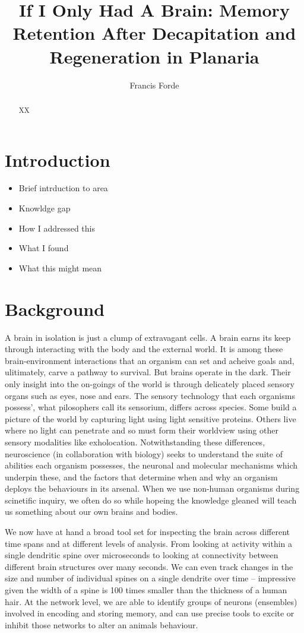 \documentclass[
  letterpaper,
  DIV=11,
  numbers=noendperiod,
  oneside]{scrartcl}
\title{If I Only Had A Brain: Memory Retention After Decapitation and
Regeneration in Planaria}
\author{Francis Forde}
\date{}
\begin{document}
\maketitle
\begin{abstract}
XX
\end{abstract}


\section{Introduction}\label{introduction}

\begin{itemize}
\item
  Brief intrduction to area
\item
  Knowldge gap
\item
  How I addressed this
\item
  What I found
\item
  What this might mean
\end{itemize}

\section{Background}\label{background}

A brain in isolation is just a clump of extravagant cells. A brain earns
its keep through interacting with the body and the external world. It is
among these brain-environment interactions that an organism can set and
acheive goals and, ulitimately, carve a pathway to survival. But brains
operate in the dark. Their only insight into the on-goings of the world
is through delicately placed sensory organs such as eyes, nose and ears.
The sensory technology that each organisms possess', what pilosophers
call its sensorium, differs across species. Some build a picture of the
world by capturing light using light sensitive proteins. Others live
where no light can penetrate and so must form their worldview using
other sensory modalities like exholocation. Notwithstanding these
differences, neuroscience (in collaboration with biology) seeks to
understand the suite of abilities each organism possesses, the neuronal
and molecular mechanisms which underpin these, and the factors that
determine when and why an organism deploys the behaviours in its
arsenal. When we use non-human organisms during scinetific inquiry, we
often do so while hopeing the knowledge gleaned will teach us something
about our own brains and bodies.

We now have at hand a broad tool set for inspecting the brain across
different time spans and at different levels of analysis. From looking
at activity within a single dendritic spine over microseconds to looking
at connectivity between different brain structures over many seconds. We
can even track changes in the size and number of individual spines on a
single dendrite over time -- impressive given the width of a spine is
100 times smaller than the thickness of a human hair. At the network
level, we are able to identify groups of neurons (ensembles) involved in
encoding and storing memory, and can use precise tools to excite or
inhibit those networks to alter an animals behaviour.
\end{document}
